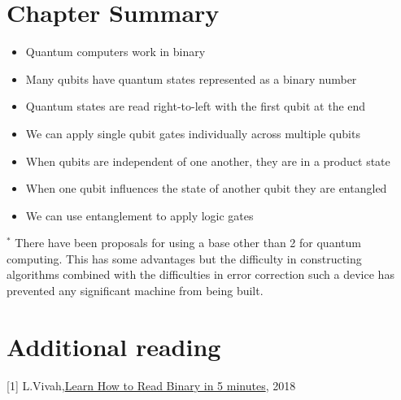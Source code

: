 \section{Chapter Summary}

\begin{itemize}
    \item Quantum computers work in binary
    \item Many qubits have quantum states represented as a binary number
    \item Quantum states are read right-to-left with the first qubit at the end
    \item We can apply single qubit gates individually across multiple qubits 
    \item When qubits are independent of one another, they are in a product state
    \item When one qubit influences the state of another qubit they are entangled 
    \item We can use entanglement to apply logic gates
\end{itemize}

$^*$ There have been proposals for using a base other than 2 for quantum computing. This has some advantages but the difficulty in constructing algorithms combined with the difficulties in error correction such a device has prevented any significant machine from being built.

\section{Additional reading}

[1] L.Vivah,\href{https://medium.com/@LindaVivah/learn-how-to-read-binary-in-5-minutes-dac1feb991e}{Learn How to Read Binary in 5 minutes}, 2018
